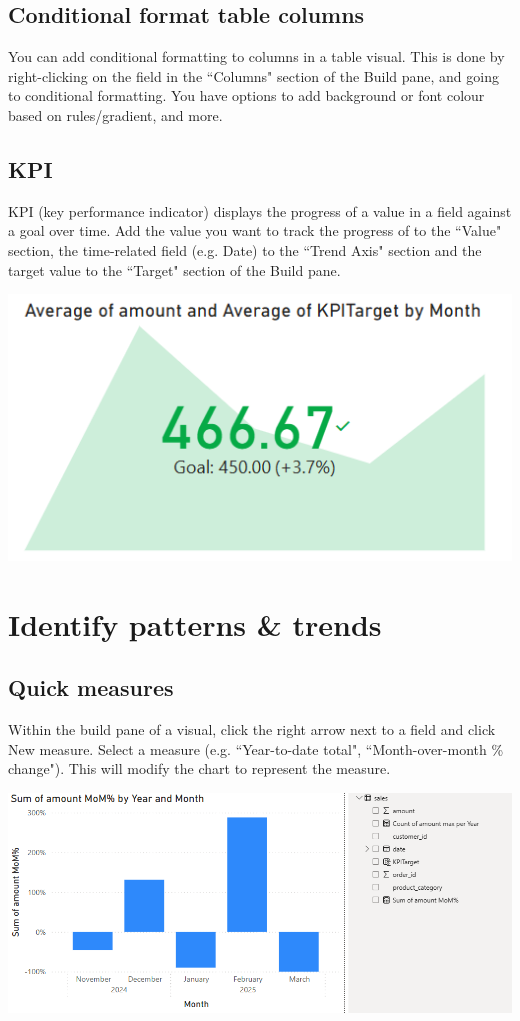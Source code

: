 \documentclass[10pt, openany, twocolumn]{book}
\begin{document}
\subsection*{Conditional format table columns}

You can add conditional formatting to columns in a table visual. This is done by right-clicking on the field in the ``Columns" section of the Build pane, and going to conditional formatting. You have options to add background or font colour based on rules/gradient, and more.

\subsection*{KPI}

KPI (key performance indicator) displays the progress of a value in a field against a goal over time. Add the value you want to track the progress of to the ``Value" section, the time-related field (e.g. Date) to the ``Trend Axis" section and the target value to the ``Target" section of the Build pane.
\begin{center}
\includegraphics[width=0.85\columnwidth]{images/KPI.png}
\end{center}


\section{Identify patterns \& trends}

\subsection*{Quick measures}

Within the build pane of a visual, click the right arrow next to a field and click New measure. Select a measure (e.g. ``Year-to-date total", ``Month-over-month \% change"). This will modify the chart to represent the measure.
\begin{center}
\includegraphics[width=1\columnwidth]{images/quick_measure.png}
\end{center}
\end{document}
